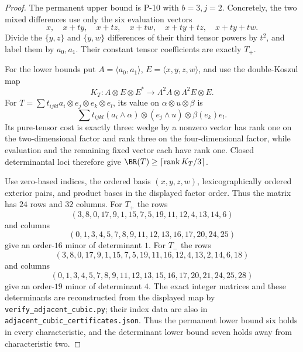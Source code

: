 \begin{proof}
The permanent upper bound is P-10 with $b=3,j=2$.
Concretely, the two mixed differences use only the six
evaluation vectors
\[
 x,\quad x+ty,\quad x+tz,\quad x+tw,\quad
 x+ty+tz,\quad x+ty+tw.
\]
Divide the $\{y,z\}$ and $\{y,w\}$ differences of
their third tensor powers by $t^2$, and label them by
$a_0,a_1$. Their constant tensor coefficients are
exactly $T_+$.

For the lower bounds put $A=\langle a_0,a_1\rangle$,
$E=\langle x,y,z,w\rangle$, and use the double-Koszul map
\[
 K_T:A\otimes E\otimes E^*
       \longrightarrow\Lambda^2A\otimes\Lambda^2E\otimes E.
\]
For $T=\sum t_{ijkl}a_i\otimes e_j\otimes e_k\otimes e_l$,
its value on $\alpha\otimes u\otimes\beta$ is
\[
 \sum t_{ijkl}(a_i\wedge\alpha)\otimes(e_j\wedge u)
                   \otimes\beta(e_k)e_l.
\]
Its pure-tensor cost is exactly three: wedge by a nonzero
vector has rank one on the two-dimensional factor and
rank three on the four-dimensional factor, while evaluation
and the remaining fixed vector each have rank one.
Closed determinantal loci therefore give
$\BR(T)\geq\lceil\operatorname{rank}K_T/3\rceil$.

Use zero-based indices, the ordered basis $(x,y,z,w)$,
lexicographically ordered exterior pairs, and product
bases in the displayed factor order. Thus the matrix
has $24$ rows and $32$ columns. For $T_+$ the rows
\[
 (3,8,0,17,9,1,15,7,5,19,11,12,4,13,14,6)
\]
and columns
\[
 (0,1,3,4,5,7,8,9,11,12,13,16,17,20,24,25)
\]
give an order-$16$ minor of determinant $1$.
For $T_-$ the rows
\[
 (3,8,0,17,9,1,15,7,5,19,11,16,12,4,13,2,14,6,18)
\]
and columns
\[
 (0,1,3,4,5,7,8,9,11,12,13,15,16,17,20,21,24,25,28)
\]
give an order-$19$ minor of determinant $4$.
The exact integer matrices and these determinants are
reconstructed from the displayed map by
\texttt{verify\_adjacent\_cubic.py}; their index data are
also in \texttt{adjacent\_cubic\_certificates.json}.
Thus the permanent lower bound six holds in every
characteristic, and the determinant lower bound seven
holds away from characteristic two.


\end{proof}
